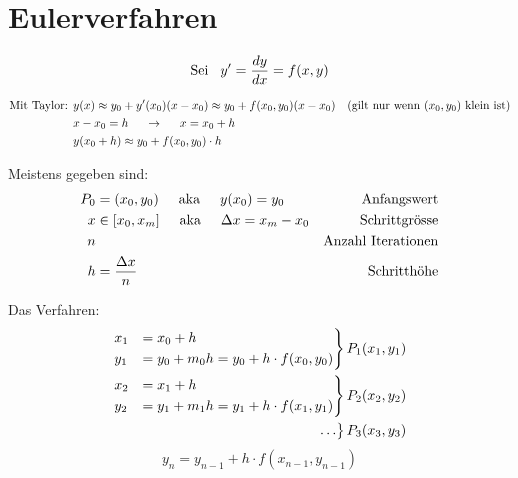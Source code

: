 \section{Eulerverfahren}

\begin{equation*}
    \textrm{Sei}\hspace{3mm} y' = \frac{dy}{dx} = f(x, y)
\end{equation*}

\begin{align*}
    \textrm{Mit Taylor: } &  y(x)\approx y_0 + y'(x_0)(x-x_0) \approx y_0 + f(x_0,y_0)(x-x_0) & \textrm{(gilt nur wenn $(x_0,y_0)$ klein ist)} \\
                          & x-x_0 = h \hspace{5mm}\rightarrow\hspace{5mm} x = x_0 + h & \\
                          & y(x_0 + h) \approx y_0 + f(x_0,y_0) \cdot h & \\
\end{align*}

Meistens gegeben sind:
\begin{align*}
    P_0 &= (x_0,y_0) \hspace{5mm}\textrm{aka}\hspace{5mm} y(x_0)=y_0             & \textrm{Anfangswert} \\
    x   &\in [x_0, x_m] \hspace{5mm}\textrm{aka}\hspace{5mm} \Delta x=x_m-x_0    & \textrm{Schrittgr\"osse}\\
    n   &                                                  & \textrm{Anzahl Iterationen}\\
    h   &= \frac{\Delta x}{n}                              & \textrm{Schritth\"ohe}\\
\end{align*}

Das Verfahren:
\begin{align*}
    \begin{rcases}
        x_1 &= x_0 + h \\
        y_1 &= y_0 + m_0 h = y_0 + h\cdot f(x_0,y_0) \\
    \end{rcases} P_1(x_1,y_1) \\
    \begin{rcases}
        x_2 &= x_1 + h \\
        y_2 &= y_1 + m_1 h = y_1 + h\cdot f(x_1,y_1) \\
    \end{rcases} P_2(x_2,y_2) \\
    \begin{rcases}
        \ldots \\
    \end{rcases} P_3(x_3,y_3) \\
\end{align*}
\begin{equation*}[box=\widebox]
y_{n}=y_{n-1}+h\cdot f\left(x_{n-1},y_{n-1}\right)
\end{equation*}

